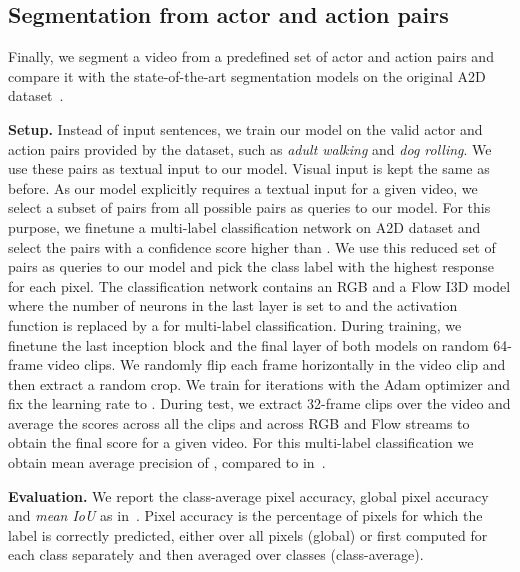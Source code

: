 \subsection{Segmentation from actor and action pairs}
\label{sec:experiments:semantic}
Finally, we segment a video from a predefined set of actor and action pairs and compare it with the state-of-the-art segmentation models on the original A2D dataset~\cite{xu2015fly}.

\textbf{Setup.} Instead of input sentences, we train our model on the  valid actor and action pairs provided by the dataset, such as \textit{adult walking} and \textit{dog rolling}. We use these pairs as textual input to our model. Visual input is kept the same as before. 
As our model explicitly requires a textual input for a given video, we select a subset of pairs from all possible pairs as queries to our model. For this purpose, we finetune a multi-label classification network on A2D dataset and select the pairs with a confidence score higher than . We use this reduced set of pairs as queries to our model and pick the class label with the highest response for each pixel. The classification network contains an RGB and a Flow I3D model where the number of neurons in the last layer is set to  and the activation function is replaced by a  for multi-label classification. During training, we finetune the last inception block and the final layer of both models on random 64-frame video clips. We randomly flip each frame horizontally in the video clip and then extract a  random crop. We train for  iterations with the Adam optimizer and fix the learning rate to . During test, we extract 32-frame clips over the video and average the scores across all the clips and across RGB and Flow streams to obtain the final score for a given video. For this multi-label classification we obtain mean average precision of , compared to  in~\cite{xu2015fly}.

\textbf{Evaluation.} We report the class-average pixel accuracy, global pixel accuracy and \textit{mean IoU} as in~\cite{kalogeiton2017joint}. Pixel accuracy is the percentage of pixels for which the label is correctly predicted, either over all pixels (global) or first computed for each class separately and then averaged over classes (class-average).

